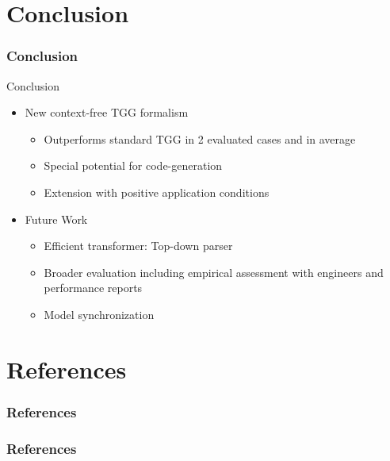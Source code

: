 \documentclass[usenames,dvipsnames]{beamer}
\begin{document}
	\section{Conclusion}
	\begin{frame}
		\frametitle{Conclusion}
	\end{frame}
	
	\begin{frame}{Conclusion}
		\begin{itemize}
			\item New context-free TGG formalism
			\begin{itemize}
				\item Outperforms standard TGG in 2 evaluated cases and in average
				\item Special potential for code-generation
				\item Extension with positive application conditions
			\end{itemize}
			\pause
			\item Future Work
			\begin{itemize}
				\item Efficient transformer: Top-down parser
				\item Broader evaluation including empirical assessment with engineers and performance reports
				\item Model synchronization
			\end{itemize}
		\end{itemize}
	\end{frame}
	
	\section{References}
	\begin{frame}
		\frametitle{References}
	\end{frame}
	
	\begin{frame}
		\frametitle{References}
		\tiny
		
		
	\end{frame}

	\appendix
	
\end{document}
